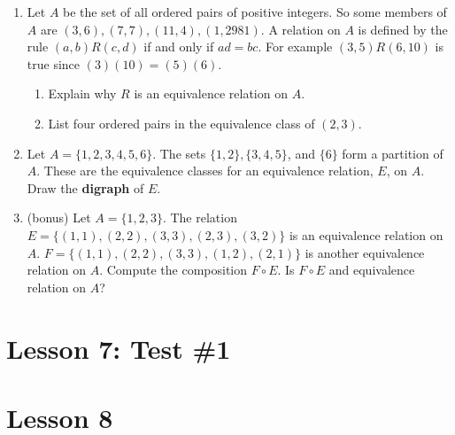 \documentclass[11pt]{amsart}
\begin{document}
\begin{enumerate}
\item Let $A$ be the set of all ordered pairs of positive integers.
So some members of $A$ are $(3,6),  (7,7), (11,4), (1,2981)$. A relation on $A$ is defined by the rule 
$(a,b) R (c,d)$ if and only if $ad = bc$. For example $(3,5) R (6,10)$ is true since $(3)(10)=(5)(6)$.\\[3pt]
\begin{enumerate}
\item Explain why $R$ is an equivalence relation on $A$.\\[3pt]
\item List four ordered pairs in the equivalence class of $(2,3)$.\\[5pt] 
\end{enumerate}

\item   Let $A=\{1,2,3,4,5,6\}$. 
 The sets $\{1, 2\}, \{3, 4, 5\}$, and $\{6\}$ form a partition of $A$.
These are the equivalence classes for an equivalence relation, $E$, on $A$.
 Draw the  {\bf digraph} of $E$.\\[5pt]

\item (bonus) Let $A = \{ 1,2,3\}$. The relation $E = \{ (1,1),(2,2),(3,3),(2,3),(3,2)\}$ is an
equivalence relation on $A$.  $F=\{ (1,1),(2,2),(3,3),(1,2),(2,1)\}$ 
is another equivalence relation on $A$. Compute the composition $F\circ E$.
Is $F\circ E$ and equivalence relation on $A$?

\end{enumerate}

\section{Lesson 7: Test \#1}

\section{Lesson 8}
\end{document}
